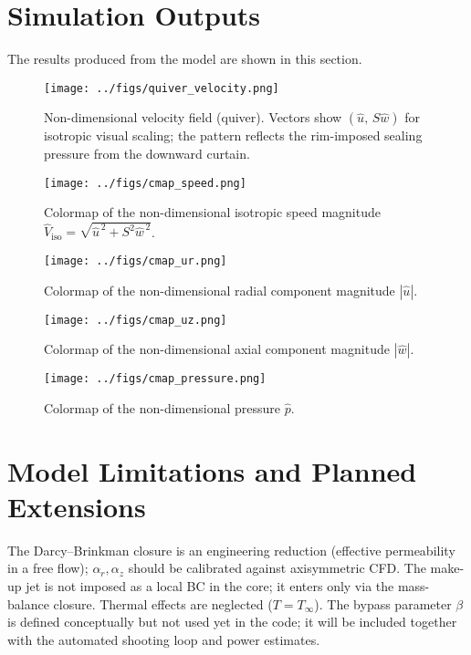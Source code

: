 \documentclass[11pt,a4paper]{article}
\begin{document}
\section{Simulation Outputs}
\label{sec:simulation-outputs}

The results produced from the model are shown in this section.

\begin{figure}[H]
  \centering
  \texttt{[image: ../figs/quiver\_velocity.png]}
  \caption{Non-dimensional velocity field (quiver).
Vectors show $(\hat u,\,S\hat w)$ for isotropic visual scaling; the pattern reflects the rim-imposed sealing pressure from the downward curtain.}
  \label{fig:quiver}
\end{figure}
\begin{figure}[H]
  \centering
  \texttt{[image: ../figs/cmap\_speed.png]}
  \caption{Colormap of the non-dimensional isotropic speed magnitude $\hat V_{\mathrm{iso}}=\sqrt{\hat u^{\,2}+S^{2}\hat w^{\,2}}$.}
  \label{fig:cmap_speed}
\end{figure}
\begin{figure}[H]
  \centering
  \texttt{[image: ../figs/cmap\_ur.png]}
  \caption{Colormap of the non-dimensional radial component magnitude $|\hat u|$.}
  \label{fig:cmap_ur}
\end{figure}
\begin{figure}[H]
  \centering
  \texttt{[image: ../figs/cmap\_uz.png]}
  \caption{Colormap of the non-dimensional axial component magnitude $|\hat w|$.}
  \label{fig:cmap_uz}
\end{figure}
\begin{figure}[H]
  \centering
  \texttt{[image: ../figs/cmap\_pressure.png]}
  \caption{Colormap of the non-dimensional pressure $\hat p$.}
  \label{fig:cmap_p}
\end{figure}

\section{Model Limitations and Planned Extensions}
\label{sec:model-limitations-and-planned-extensions}

The Darcy--Brinkman closure is an engineering reduction (effective permeability in a
free flow); $\alpha_r,\alpha_z$ should be calibrated against axisymmetric CFD.
The make-up jet is not imposed as a local BC in the core; it enters only via the
mass-balance closure. Thermal effects are neglected ($T=T_\infty$). The bypass parameter
$\beta$ is defined conceptually but not used yet in the code; it will be included together
with the automated shooting loop and power estimates.
\end{document}
